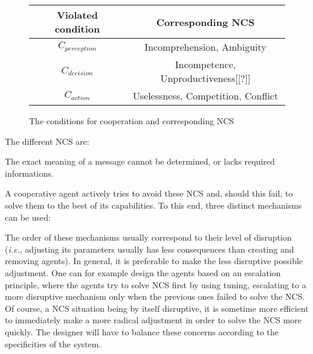 \begin{figure}
\centering
\begin{tabular}{|c|c|}
\hline
\textbf{Violated condition}	& \textbf{Corresponding NCS} \\
\hline
$C_{perception}$     & Incomprehension, Ambiguity     \\
\hline
$C_{decision}$      & Incompetence, Unproductiveness[[?]] \\
\hline
$C_{action}$     & Uselessness, Competition, Conflict\\
\hline
\end{tabular}
\caption{The conditions for cooperation and corresponding NCS}
\label{NCS}
\end{figure}

The different NCS are:

 {The exact meaning of a message cannot be determined, or lacks required informations.}

A cooperative agent actively tries to avoid these NCS and, should this fail, to solve them to the best of its capabilities. To this end, three distinct mechanisms can be used\cite{bonjean2009engineering}:


The order of these mechanisms usually correspond to their level of disruption (\textit{i.e.}, adjusting its parameters usually has less consequences than creating and removing agents). In general, it is preferable to make the less disruptive possible adjustment. One can for example design the agents based on an escalation principle, where the agents try to solve NCS first by using tuning, escalating to a more disruptive mechanism only when the previous ones failed to solve the NCS. Of course, a NCS situation being by itself disruptive, it is sometime more efficient to immediately make a more radical adjustment in order to solve the NCS more quickly. The designer will have to balance these concerns according to the specificities of the system.

